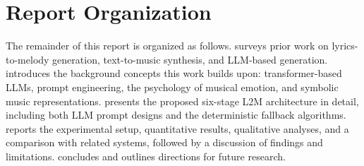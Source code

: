 \section{Report Organization}
\label{sec:organization}

The remainder of this report is organized as follows.
 surveys prior work on lyrics-to-melody
generation, text-to-music synthesis, and LLM-based generation.
 introduces the background concepts this work
builds upon: transformer-based LLMs, prompt engineering, the psychology of
musical emotion, and symbolic music representations.
 presents the proposed six-stage L2M architecture
in detail, including both LLM prompt designs and the deterministic fallback
algorithms.  reports the experimental setup,
quantitative results, qualitative analyses, and a comparison with related
systems, followed by a discussion of findings and limitations.
 concludes and outlines directions for
future research.
